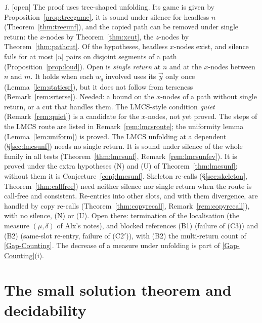 \documentclass[11pt]{article}
\newcommand{\Open}{\textsf{\color{red!60!black}[open]}}
\theoremstyle{plain}
\theoremstyle{definition}
\theoremstyle{remark}
\newtheorem*{gapenv}{\gapname}
\newcommand{\gapname}{Gap}
\newcommand{\GapCounting}{\hyperref[gap:count]{[Gap-Counting]}}
\begin{document}
\renewcommand{\gapname}{[Gap-Unfolding]}
\begin{gapenv}\label{gap:unfold}
\Open{}
The proof uses tree-shaped unfolding.  Its game is given by
Proposition~\ref{prop:treegame}, it is sound under silence for headless
$n$ (Theorem~\ref{thm:treeunf}), and the copied path can be removed
under single return: the $x$-nodes by Theorem~\ref{thm:xcut}, the
$z$-nodes by Theorem~\ref{thm:pathcut}.  Of the hypotheses, headless
$x$-nodes exist, and silence fails for at most $|u|$ pairs on disjoint
segments of a path (Proposition~\ref{prop:loud}).  Open is \emph{single
return} at $n$ and at the $x$-nodes between $n$ and $m$.  It holds when
each $w_q$ involved uses its $\vec y$ only once
(Lemma~\ref{lem:staticsr}), but it does not follow from terseness
(Remark~\ref{rem:srterse}).  Needed: a bound on the $x$-nodes of a path
without single return, or a cut that handles them.  The LMCS-style
condition \emph{quiet} (Remark~\ref{rem:quiet}) is a candidate for the
$x$-nodes, not yet proved.  The steps of the LMCS route are listed in
Remark~\ref{rem:lmcsroute}; the uniformity lemma
(Lemma~\ref{lem:uniform}) is proved.  The LMCS unfolding at a dependent
(\S\ref{sec:lmcsunf}) needs no single return.  It is sound under
silence of the whole family in all tests
(Theorem~\ref{thm:lmcsunf}, Remark~\ref{rem:lmcsunfev}).  It is proved under
the extra hypotheses (N) and (U) of Theorem~\ref{thm:lmcsunf}; without them
it is Conjecture~\ref{conj:lmcsunf}.  Skeleton re-calls (\S\ref{sec:skeleton},
Theorem~\ref{thm:callfree}) need neither silence nor single return when
the route is call-free and consistent.  Re-entries into other slots,
and with them divergence, are handled by copy re-calls
(Theorem~\ref{thm:copyrecall}, Remark~\ref{rem:copyrecall}), with no
silence, (N) or (U).  Open there: termination of the localisation (the
measure $(\mu,\delta)$ of Alx's notes), and blocked references (B1)
(failure of (C3)) and (B2) (same-slot re-entry, failure of (C2$'$)), with
(B2) the multi-return count of \GapCounting{}.  The decrease of a
measure under unfolding is part of \GapCounting{}(i).
\end{gapenv}



\section{The small solution theorem and decidability}\label{sec:thm37}
\end{document}
